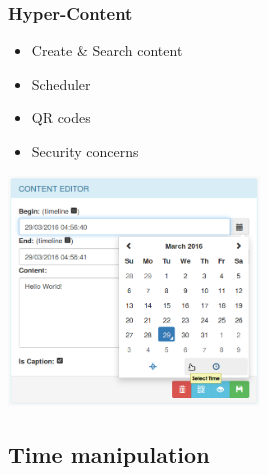 \documentclass[compress]{beamer}
\begin{document}
		\begin{frame}[c]
		\frametitle{Hyper-Content}


		\begin{itemize}
		\item Create \& Search content
				\vfill
\item Scheduler
		\vfill
		\item QR codes
		\vfill
		\item Security concerns
		\end{itemize}

		\begin{flushright}

			\vspace*{-11\baselineskip}
			\includegraphics[width=0.5\textwidth]{figures/edition.png}
		\end{flushright}
		

		\end{frame}


\subsection{Time manipulation}
\end{document}
